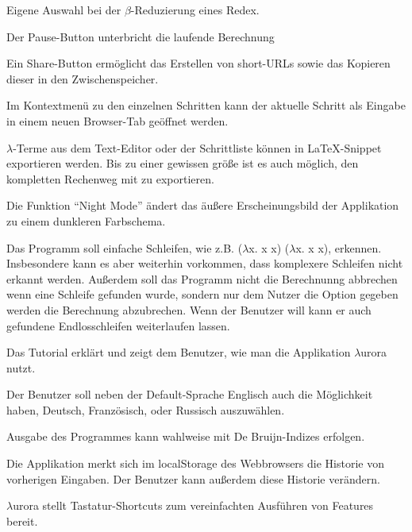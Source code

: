 \documentclass[parskip=full,11pt,twoside]{scrartcl}
\begin{document}
Eigene Auswahl bei der $\beta$-Reduzierung eines Redex.

Der Pause-Button unterbricht die laufende Berechnung

Ein Share-Button ermöglicht das Erstellen von short-URLs sowie das Kopieren dieser in den Zwischenspeicher.

Im Kontextmenü zu den einzelnen Schritten kann der aktuelle Schritt als Eingabe in einem neuen Browser-Tab geöffnet werden.

$\lambda$-Terme aus dem Text-Editor oder der Schrittliste können in LaTeX-Snippet exportieren werden. Bis zu einer gewissen größe ist es auch möglich, den kompletten Rechenweg mit zu exportieren.

Die Funktion \enquote{Night Mode} ändert das äußere Erscheinungsbild der Applikation zu einem dunkleren Farbschema.

Das Programm soll einfache Schleifen, wie z.B. ($\lambda$x. x x) ($\lambda$x. x x), erkennen. Insbesondere kann es aber weiterhin vorkommen, dass komplexere Schleifen nicht erkannt werden.
Außerdem soll das Programm nicht die Berechnunng abbrechen wenn eine Schleife gefunden wurde, sondern nur dem Nutzer die Option gegeben werden die Berechnung abzubrechen. Wenn der Benutzer  will kann er auch gefundene Endlosschleifen weiterlaufen lassen.

Das Tutorial erklärt und zeigt dem Benutzer, wie man die Applikation $\lambda$urora nutzt.

Der Benutzer soll neben der Default-Sprache Englisch auch die Möglichkeit haben, Deutsch, Französisch, oder Russisch auszuwählen.

Ausgabe des Programmes kann wahlweise mit De Bruijn-Indizes erfolgen.

Die Applikation merkt sich im localStorage des Webbrowsers die Historie von vorherigen Eingaben. Der Benutzer kann außerdem diese Historie verändern.

$\lambda$urora stellt Tastatur-Shortcuts zum vereinfachten Ausführen von Features bereit.
\end{document}
